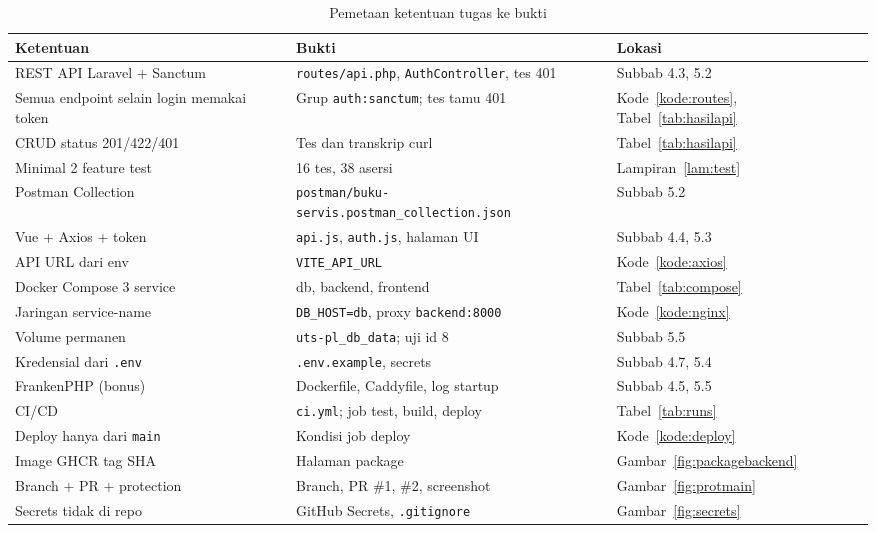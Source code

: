 \documentclass[12pt,a4paper,oneside]{book}
\begin{document}
\begin{table}[H]
\centering
\caption{Pemetaan ketentuan tugas ke bukti}
\label{tab:checklist}
\small
\begin{tabularx}{\textwidth}{@{}p{4.3cm} X p{2.1cm}@{}}
\toprule
\textbf{Ketentuan} & \textbf{Bukti} & \textbf{Lokasi} \\
\midrule
REST API Laravel + Sanctum & \texttt{routes/api.php}, \texttt{AuthController}, tes 401 & Subbab 4.3, 5.2 \\
Semua endpoint selain login memakai token & Grup \texttt{auth:sanctum}; tes tamu 401 & Kode~\ref{kode:routes}, Tabel~\ref{tab:hasilapi} \\
CRUD status 201/422/401 & Tes dan transkrip curl & Tabel~\ref{tab:hasilapi} \\
Minimal 2 feature test & 16 tes, 38 asersi & Lampiran~\ref{lam:test} \\
Postman Collection & \texttt{postman/buku-servis.postman\_collection.json} & Subbab 5.2 \\
Vue + Axios + token & \texttt{api.js}, \texttt{auth.js}, halaman UI & Subbab 4.4, 5.3 \\
API URL dari env & \texttt{VITE\_API\_URL} & Kode~\ref{kode:axios} \\
Docker Compose 3 service & db, backend, frontend & Tabel~\ref{tab:compose} \\
Jaringan service-name & \texttt{DB\_HOST=db}, proxy \texttt{backend:8000} & Kode~\ref{kode:nginx} \\
Volume permanen & \texttt{uts-pl\_db\_data}; uji id 8 & Subbab 5.5 \\
Kredensial dari \texttt{.env} & \texttt{.env.example}, secrets & Subbab 4.7, 5.4 \\
FrankenPHP (bonus) & Dockerfile, Caddyfile, log startup & Subbab 4.5, 5.5 \\
CI/CD & \texttt{ci.yml}; job test, build, deploy & Tabel~\ref{tab:runs} \\
Deploy hanya dari \texttt{main} & Kondisi job deploy & Kode~\ref{kode:deploy} \\
Image GHCR tag SHA & Halaman package & Gambar~\ref{fig:packagebackend} \\
Branch + PR + protection & Branch, PR \#1, \#2, screenshot & Gambar~\ref{fig:protmain} \\
Secrets tidak di repo & GitHub Secrets, \texttt{.gitignore} & Gambar~\ref{fig:secrets} \\
\bottomrule
\end{tabularx}
\end{table}
\end{document}
